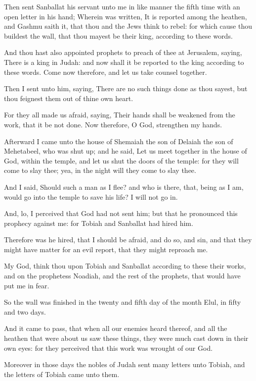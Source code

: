 \verse Then sent Sanballat his servant unto me in like manner the fifth time with an open letter in his hand; \verse Wherein was written, It is reported among the heathen, and Gashmu saith it, that thou and the Jews think to rebel: for which cause thou buildest the wall, that thou mayest be their king, according to these words.

\verse And thou hast also appointed prophets to preach of thee at Jerusalem, saying, There is a king in Judah: and now shall it be reported to the king according to these words. Come now therefore, and let us take counsel together.

\verse Then I sent unto him, saying, There are no such things done as thou sayest, but thou feignest them out of thine own heart.

\verse For they all made us afraid, saying, Their hands shall be weakened from the work, that it be not done. Now therefore, O God, strengthen my hands.

\verse Afterward I came unto the house of Shemaiah the son of Delaiah the son of Mehetabeel, who was shut up; and he said, Let us meet together in the house of God, within the temple, and let us shut the doors of the temple: for they will come to slay thee; yea, in the night will they come to slay thee.

\verse And I said, Should such a man as I flee? and who is there, that, being as I am, would go into the temple to save his life? I will not go in.

\verse And, lo, I perceived that God had not sent him; but that he pronounced this prophecy against me: for Tobiah and Sanballat had hired him.

\verse Therefore was he hired, that I should be afraid, and do so, and sin, and that they might have matter for an evil report, that they might reproach me.

\verse My God, think thou upon Tobiah and Sanballat according to these their works, and on the prophetess Noadiah, and the rest of the prophets, that would have put me in fear.

\verse So the wall was finished in the twenty and fifth day of the month Elul, in fifty and two days.

\verse And it came to pass, that when all our enemies heard thereof, and all the heathen that were about us saw these things, they were much cast down in their own eyes: for they perceived that this work was wrought of our God.

\verse Moreover in those days the nobles of Judah sent many letters unto Tobiah, and the letters of Tobiah came unto them.


